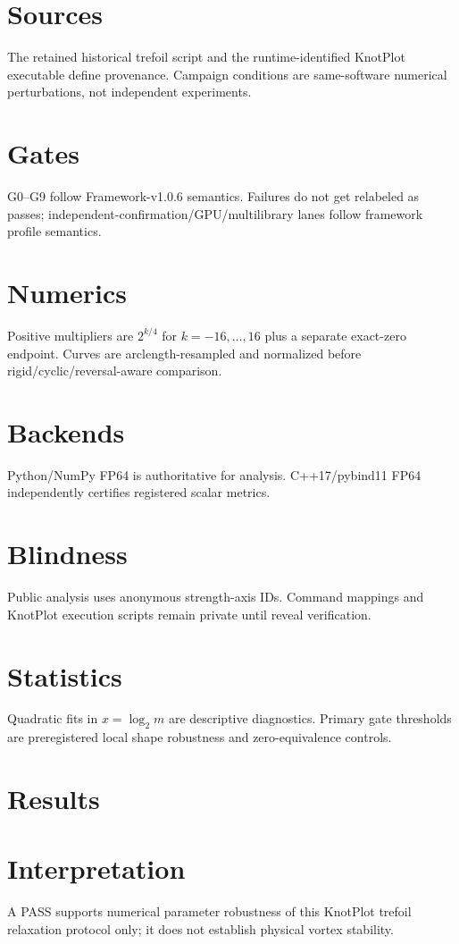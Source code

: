 \documentclass[11pt,a4paper]{article}
\begin{document}
\section{Sources}
The retained historical trefoil script and the runtime-identified KnotPlot executable define provenance. Campaign conditions are same-software numerical perturbations, not independent experiments.
\section{Gates}
G0--G9 follow Framework-v1.0.6 semantics. Failures do not get relabeled as passes; independent-confirmation/GPU/multilibrary lanes follow framework profile semantics.
\section{Numerics}
Positive multipliers are $2^{k/4}$ for $k=-16,\ldots,16$ plus a separate exact-zero endpoint. Curves are arclength-resampled and normalized before rigid/cyclic/reversal-aware comparison.
\section{Backends}
Python/NumPy FP64 is authoritative for analysis. C++17/pybind11 FP64 independently certifies registered scalar metrics.
\section{Blindness}
Public analysis uses anonymous strength-axis IDs. Command mappings and KnotPlot execution scripts remain private until reveal verification.
\section{Statistics}
Quadratic fits in $x=\log_2m$ are descriptive diagnostics. Primary gate thresholds are preregistered local shape robustness and zero-equivalence controls.
\section{Results}
\section{Interpretation}
A PASS supports numerical parameter robustness of this KnotPlot trefoil relaxation protocol only; it does not establish physical vortex stability.
\end{document}
